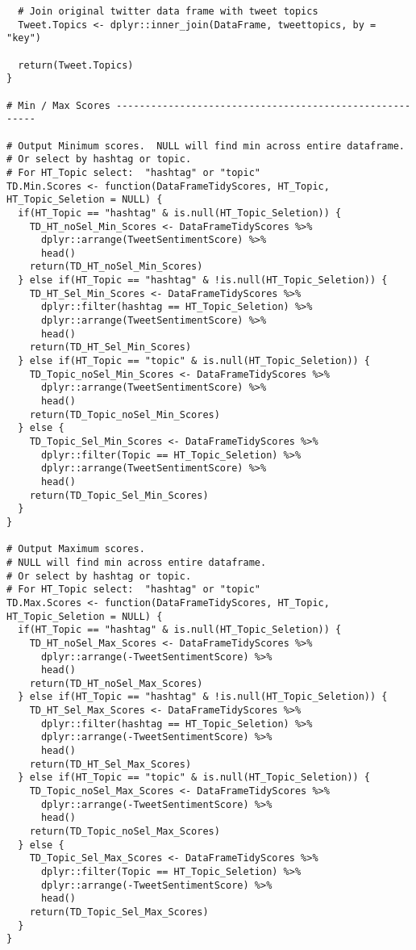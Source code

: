 \begin{lstlisting}
  # Join original twitter data frame with tweet topics
  Tweet.Topics <- dplyr::inner_join(DataFrame, tweettopics, by = "key")
  
  return(Tweet.Topics)
}

# Min / Max Scores --------------------------------------------------------

# Output Minimum scores.  NULL will find min across entire dataframe.  
# Or select by hashtag or topic.
# For HT_Topic select:  "hashtag" or "topic"
TD.Min.Scores <- function(DataFrameTidyScores, HT_Topic, HT_Topic_Seletion = NULL) {
  if(HT_Topic == "hashtag" & is.null(HT_Topic_Seletion)) {
    TD_HT_noSel_Min_Scores <- DataFrameTidyScores %>% 
      dplyr::arrange(TweetSentimentScore) %>% 
      head()
    return(TD_HT_noSel_Min_Scores)
  } else if(HT_Topic == "hashtag" & !is.null(HT_Topic_Seletion)) {
    TD_HT_Sel_Min_Scores <- DataFrameTidyScores %>% 
      dplyr::filter(hashtag == HT_Topic_Seletion) %>% 
      dplyr::arrange(TweetSentimentScore) %>% 
      head()
    return(TD_HT_Sel_Min_Scores)
  } else if(HT_Topic == "topic" & is.null(HT_Topic_Seletion)) {
    TD_Topic_noSel_Min_Scores <- DataFrameTidyScores %>% 
      dplyr::arrange(TweetSentimentScore) %>% 
      head()
    return(TD_Topic_noSel_Min_Scores)
  } else {
    TD_Topic_Sel_Min_Scores <- DataFrameTidyScores %>% 
      dplyr::filter(Topic == HT_Topic_Seletion) %>% 
      dplyr::arrange(TweetSentimentScore) %>% 
      head()
    return(TD_Topic_Sel_Min_Scores)
  }
}

# Output Maximum scores.  
# NULL will find min across entire dataframe.  
# Or select by hashtag or topic.
# For HT_Topic select:  "hashtag" or "topic"
TD.Max.Scores <- function(DataFrameTidyScores, HT_Topic, HT_Topic_Seletion = NULL) {
  if(HT_Topic == "hashtag" & is.null(HT_Topic_Seletion)) {
    TD_HT_noSel_Max_Scores <- DataFrameTidyScores %>% 
      dplyr::arrange(-TweetSentimentScore) %>% 
      head()
    return(TD_HT_noSel_Max_Scores)
  } else if(HT_Topic == "hashtag" & !is.null(HT_Topic_Seletion)) {
    TD_HT_Sel_Max_Scores <- DataFrameTidyScores %>% 
      dplyr::filter(hashtag == HT_Topic_Seletion) %>% 
      dplyr::arrange(-TweetSentimentScore) %>% 
      head()
    return(TD_HT_Sel_Max_Scores)
  } else if(HT_Topic == "topic" & is.null(HT_Topic_Seletion)) {
    TD_Topic_noSel_Max_Scores <- DataFrameTidyScores %>% 
      dplyr::arrange(-TweetSentimentScore) %>% 
      head()
    return(TD_Topic_noSel_Max_Scores)
  } else {
    TD_Topic_Sel_Max_Scores <- DataFrameTidyScores %>% 
      dplyr::filter(Topic == HT_Topic_Seletion) %>% 
      dplyr::arrange(-TweetSentimentScore) %>% 
      head()
    return(TD_Topic_Sel_Max_Scores)
  }
}


\end{lstlisting}
